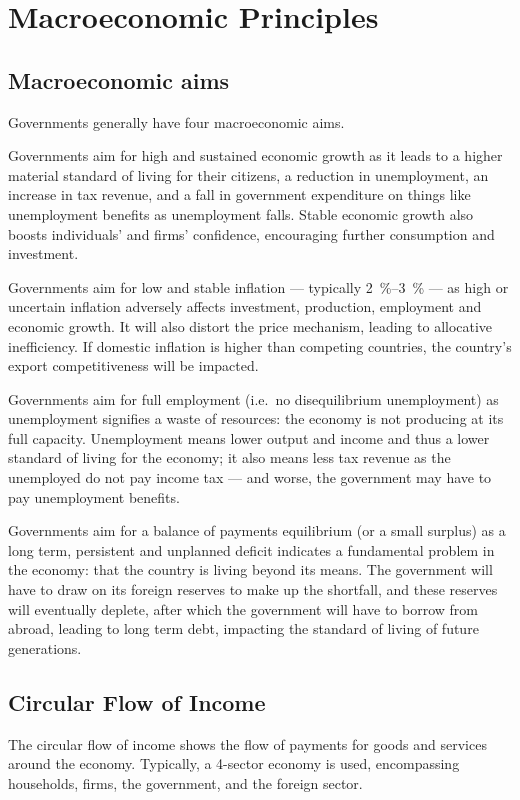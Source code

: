 \documentclass[Economics.tex]{subfiles}
\begin{document}
\chapter{Macroeconomic Principles}
\section{Macroeconomic aims}
Governments generally have four macroeconomic aims.

Governments aim for high and sustained economic growth as it leads to a higher material standard of living for their citizens, a reduction in unemployment, an increase in tax revenue, and a fall in government expenditure on things like unemployment benefits as unemployment falls. Stable economic growth also boosts individuals' and firms' confidence, encouraging further consumption and investment.

Governments aim for low and stable inflation --- typically \SIrange{2}{3}{\percent} --- as high or uncertain inflation adversely affects investment, production, employment and economic growth. It will also distort the price mechanism, leading to allocative inefficiency. If domestic inflation is higher than competing countries, the country's export competitiveness will be impacted.

Governments aim for full employment (i.e.\ no disequilibrium unemployment) as unemployment signifies a waste of resources: the economy is not producing at its full capacity. Unemployment means lower output and income and thus a lower standard of living for the economy; it also means less tax revenue as the unemployed do not pay income tax --- and worse, the government may have to pay unemployment benefits.

Governments aim for a balance of payments equilibrium (or a small surplus) as a long term, persistent and unplanned deficit indicates a fundamental problem in the economy: that the country is living beyond its means. The government will have to draw on its foreign reserves to make up the shortfall, and these reserves will eventually deplete, after which the government will have to borrow from abroad, leading to long term debt, impacting the standard of living of future generations.
\section{Circular Flow of Income}
The circular flow of income shows the flow of payments for goods and services around the economy. Typically, a 4-sector economy is used, encompassing households, firms, the government, and the foreign sector.
\end{document}
